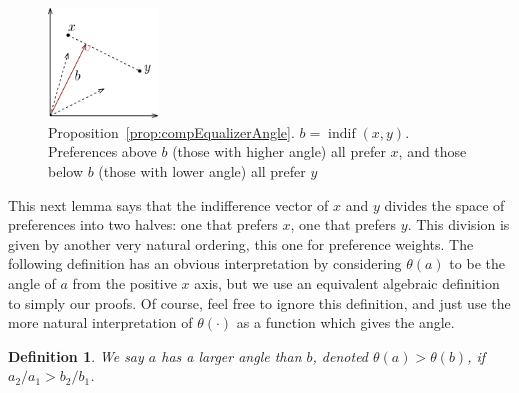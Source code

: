 \documentclass[12pt]{article}
\newtheorem*{definition}{Definition}
\DeclareMathOperator*{\indif}{indif}
\newcommand{\1}[1]{\mathds{1}[{#1}]}
\begin{document}
    \begin{figure}
      \vspace{-0.4in}
      \begin{center}
        \includegraphics[width=0.26\textwidth]{figures/clmAngle}
      \end{center}
      \caption{
        Proposition~\ref{prop:compEqualizerAngle}. $b=\indif(x,y)$.
        Preferences above $b$ (those with higher angle) all prefer $x$,
        and those below $b$ (those with lower angle) all prefer $y$
      }
      \vspace{-0.7in}
    \end{figure}

    This next lemma says that the indifference vector of $x$ and $y$ divides 
    the space of preferences into two halves: one that prefers $x$, one that
    prefers $y$. This division is given by another very natural ordering,
    this one for preference weights. The following definition has an obvious
    interpretation by considering $\theta(a)$ to be the angle of $a$ from the
    positive $x$ axis, but we use an equivalent algebraic definition to simply
    our proofs.
    Of course, feel free to ignore this definition, and just use the more
    natural interpretation of $\theta(\cdot)$ as a function which gives the angle.

    \begin{definition}
      We say $a$ has a larger angle than $b$, denoted $\theta(a) > \theta(b)$,
      if $a_2 / a_1 > b_2 / b_1$.
    \end{definition}
\end{document}
